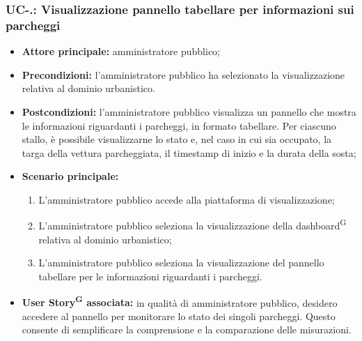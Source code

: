 \documentclass[8pt]{article}
\newcommand{\glossterm}[1]{#1\textsuperscript{G}} %
\begin{document}
\subsubsection*{UC-\theuc .\speconenumber: Visualizzazione pannello tabellare per informazioni sui parcheggi}
\begin{itemize}
    \item \textbf{Attore principale:} amministratore pubblico;
    \item \textbf{Precondizioni:} l'amministratore pubblico ha selezionato la visualizzazione
        relativa al dominio urbanistico.
    \item \textbf{Postcondizioni:} l'amministratore pubblico visualizza un pannello che mostra le informazioni riguardanti i parcheggi, in formato tabellare. Per ciascuno stallo, è possibile visualizzarne lo stato e, nel caso in cui sia occupato, la targa della vettura parcheggiata, il timestamp di inizio e la durata della sosta;
    \item \textbf{Scenario principale:} 
    \begin{enumerate}
    \item L'amministratore pubblico accede alla piattaforma di visualizzazione;
    \item L'amministratore pubblico seleziona la visualizzazione della \glossterm{dashboard} relativa al dominio
        urbanistico;
    \item L'amministratore pubblico seleziona la visualizzazione del pannello tabellare per le informazioni riguardanti i parcheggi.
    \end{enumerate}
    \item \textbf{\glossterm{User Story} associata:} in qualità di amministratore pubblico, desidero accedere al pannello per monitorare lo stato dei singoli parcheggi. Questo consente di semplificare la comprensione e la comparazione delle misurazioni.
\end{itemize}
\end{document}
